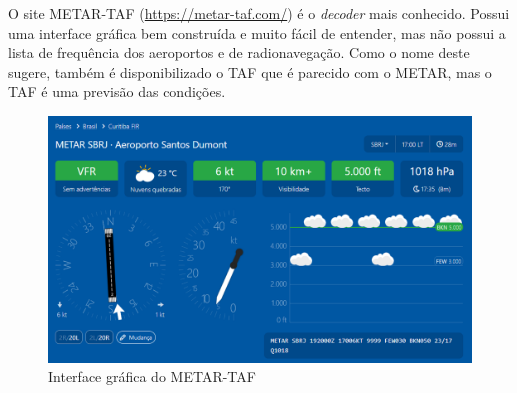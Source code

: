 O site METAR-TAF (\url{https://metar-taf.com/}) é o \textit{decoder} mais conhecido. 
Possui
uma interface gráfica bem construída e muito fácil de entender, mas não possui a
lista de frequência dos aeroportos e de radionavegação. Como o nome deste sugere,
também é disponibilizado o TAF que é parecido com o METAR, mas o TAF é uma 
previsão das condições.

\begin{figure}[ht]
    \begin{center}
    \includegraphics[width=400pt]{img/ui-metar-taf.png}
    \caption{Interface gráfica do METAR-TAF}
    \label{fig:metar-taf}
    \end{center}
\end{figure}
